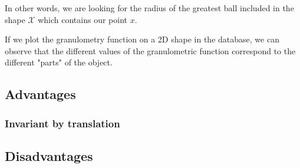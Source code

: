 In other words, we are looking for the radius of the greatest ball included in the shape $\mathcal{X}$ which contains our point $x$.

If we plot the granulometry function on a 2D shape in the database, we can observe that the different values of the granulometric function correspond to the different "parts" of the object.

%

\subsection{Advantages}

\subsubsection{Invariant by translation}

\subsection{Disadvantages}


